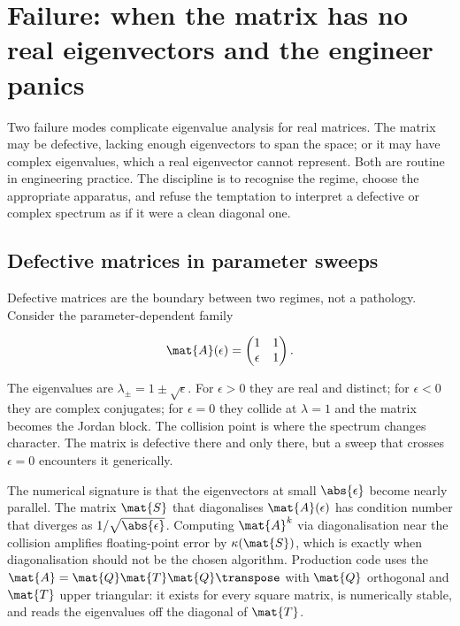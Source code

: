 \section{Failure: when the matrix has no real eigenvectors and the engineer panics}
\label{sec:vol02:ch10:failure}

Two failure modes complicate eigenvalue analysis for real matrices.
The matrix may be defective, lacking enough eigenvectors to span
the space; or it may have complex eigenvalues, which a real
eigenvector cannot represent. Both are routine in engineering
practice. The discipline is to recognise the regime, choose the
appropriate apparatus, and refuse the temptation to interpret a
defective or complex spectrum as if it were a clean diagonal one.

\subsection{Defective matrices in parameter sweeps}

Defective matrices are the boundary between two regimes, not a
pathology. Consider the parameter-dependent family

\[
\mat{A}(\epsilon) = \begin{pmatrix} 1 & 1 \\ \epsilon & 1
\end{pmatrix}.
\]

The eigenvalues are $\lambda_{\pm} = 1 \pm \sqrt{\epsilon}$. For
$\epsilon > 0$ they are real and distinct; for $\epsilon < 0$ they
are complex conjugates; for $\epsilon = 0$ they collide at
$\lambda = 1$ and the matrix becomes the Jordan block. The collision
point is where the spectrum changes character. The matrix is
defective there and only there, but a sweep that crosses
$\epsilon = 0$ encounters it generically.

The numerical signature is that the eigenvectors at small $\abs{\epsilon}$
become nearly parallel. The matrix $\mat{S}$ that diagonalises
$\mat{A}(\epsilon)$ has condition number that diverges as
$1/\sqrt{\abs{\epsilon}}$. Computing $\mat{A}^{k}$ via diagonalisation
near the collision amplifies floating-point error by $\kappa(\mat{S})$,
which is exactly when diagonalisation should not be the chosen
algorithm. Production code uses the 
$\mat{A} = \mat{Q} \mat{T} \mat{Q}\transpose$ with $\mat{Q}$
orthogonal and $\mat{T}$ upper triangular: it exists for every
square matrix, is numerically stable, and reads the eigenvalues
off the diagonal of $\mat{T}$.

